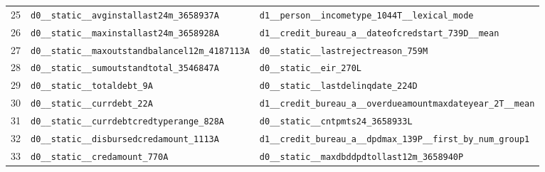 \documentclass[final,5p,twocolumn]{elsarticle}
\begin{document}
\begin{table}[htbp]
\begin{threeparttable}
\begin{tabular}{@{}rL{80mm}L{80mm}@{}}
25 & \texttt{d0\_\allowbreak \_\allowbreak static\_\allowbreak \_\allowbreak avginstallast24m\_\allowbreak 3658937A} & \texttt{d1\_\allowbreak \_\allowbreak person\_\allowbreak \_\allowbreak incometype\_\allowbreak 1044T\_\allowbreak \_\allowbreak lexical\_\allowbreak mode} \\
26 & \texttt{d0\_\allowbreak \_\allowbreak static\_\allowbreak \_\allowbreak maxinstallast24m\_\allowbreak 3658928A} & \texttt{d1\_\allowbreak \_\allowbreak credit\_\allowbreak bureau\_\allowbreak a\_\allowbreak \_\allowbreak dateofcredstart\_\allowbreak 739D\_\allowbreak \_\allowbreak mean} \\
27 & \texttt{d0\_\allowbreak \_\allowbreak static\_\allowbreak \_\allowbreak maxoutstandbalancel12m\_\allowbreak 4187113A} & \texttt{d0\_\allowbreak \_\allowbreak static\_\allowbreak \_\allowbreak lastrejectreason\_\allowbreak 759M} \\
28 & \texttt{d0\_\allowbreak \_\allowbreak static\_\allowbreak \_\allowbreak sumoutstandtotal\_\allowbreak 3546847A} & \texttt{d0\_\allowbreak \_\allowbreak static\_\allowbreak \_\allowbreak eir\_\allowbreak 270L} \\
29 & \texttt{d0\_\allowbreak \_\allowbreak static\_\allowbreak \_\allowbreak totaldebt\_\allowbreak 9A} & \texttt{d0\_\allowbreak \_\allowbreak static\_\allowbreak \_\allowbreak lastdelinqdate\_\allowbreak 224D} \\
30 & \texttt{d0\_\allowbreak \_\allowbreak static\_\allowbreak \_\allowbreak currdebt\_\allowbreak 22A} & \texttt{d1\_\allowbreak \_\allowbreak credit\_\allowbreak bureau\_\allowbreak a\_\allowbreak \_\allowbreak overdueamountmaxdateyear\_\allowbreak 2T\_\allowbreak \_\allowbreak mean} \\
31 & \texttt{d0\_\allowbreak \_\allowbreak static\_\allowbreak \_\allowbreak currdebtcredtyperange\_\allowbreak 828A} & \texttt{d0\_\allowbreak \_\allowbreak static\_\allowbreak \_\allowbreak cntpmts24\_\allowbreak 3658933L} \\
32 & \texttt{d0\_\allowbreak \_\allowbreak static\_\allowbreak \_\allowbreak disbursedcredamount\_\allowbreak 1113A} & \texttt{d1\_\allowbreak \_\allowbreak credit\_\allowbreak bureau\_\allowbreak a\_\allowbreak \_\allowbreak dpdmax\_\allowbreak 139P\_\allowbreak \_\allowbreak first\_\allowbreak by\_\allowbreak num\_\allowbreak group1} \\
33 & \texttt{d0\_\allowbreak \_\allowbreak static\_\allowbreak \_\allowbreak credamount\_\allowbreak 770A} & \texttt{d0\_\allowbreak \_\allowbreak static\_\allowbreak \_\allowbreak maxdbddpdtollast12m\_\allowbreak 3658940P} \\

\end{tabular}
\end{threeparttable}
\end{table}
\end{document}
